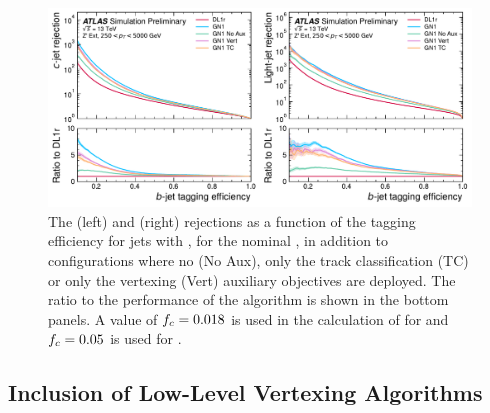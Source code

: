 \begin{figure}[!p]
    \centering
    \includegraphics[width=\textwidth]{chapters/gnn_tagger/figs/results/ablations/zprime/zprime_roc_btag.pdf}
    \caption{The \cjet (left) and \ljet (right) rejections as a function of the \bjet tagging efficiency for \Zprime jets with \Zprimept, for the nominal \GNN, in addition to configurations where no (\GNN No Aux), only the track classification (\GNN TC) or only the vertexing (\GNN Vert) auxiliary objectives are deployed. The ratio to the performance of the \DLr algorithm is shown in the bottom panels. A value of $f_c = 0.018$ is used in the calculation of \Db for \DLr and $f_c = 0.05$ is used for \GNN \cite{ATL-PHYS-PUB-2022-027}.}
    \label{fig:zprime_btag_roc_ab}
\end{figure}


\subsection{Inclusion of Low-Level Vertexing Algorithms}\label{sec:gnn_low_level_vert_impact}

